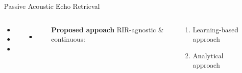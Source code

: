 \begin{frame}[t]{\alert{Passive} Acoustic Echo Retrieval \hfill\faBook}
        \vspace{1em}
        \begin{columns}[T,onlytextwidth] %
            \small
                \begin{itemize}
                    \item[\xmark] 
                    \item[\xmark] 
                    \item[\xmark] 
                \end{itemize}
                \begin{itemize}
                    \item[\xmark] 
                    \\
                \end{itemize}


                \textcolor{myred}{\textbf{Proposed appoach}} RIR-agnostic \& continuous:
                \begin{mycontriblock}
                    \begin{enumerate}
                        \item Learning-based approach
                        \item Analytical approach
                    \end{enumerate}
                \end{mycontriblock}
        \end{columns}

\end{frame}

\subsection{\lantern}

